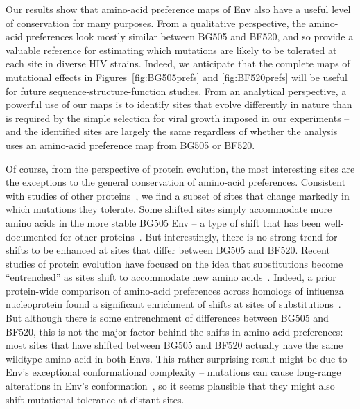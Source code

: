 \documentclass[9pt]{elife}
\begin{document}
Our results show that amino-acid preference maps of Env also have a useful level of conservation for many purposes.
From a qualitative perspective, the amino-acid preferences look mostly similar between BG505 and BF520, and so provide a valuable reference for estimating which mutations are likely to be tolerated at each site in diverse HIV strains.
Indeed, we anticipate that the complete maps of mutational effects in Figures~\ref{fig:BG505prefs} and \ref{fig:BF520prefs} will be useful for future sequence-structure-function studies.
From an analytical perspective, a powerful use of our maps is to identify sites that evolve differently in nature than is required by the simple selection for viral growth imposed in our experiments -- and the identified sites are largely the same regardless of whether the analysis uses an amino-acid preference map from BG505 or BF520.

Of course, from the perspective of protein evolution, the most interesting sites are the exceptions to the general conservation of amino-acid preferences.
Consistent with studies of other proteins~\citep{natarajan2013epistasis,harms2014historical,doud2015site,starr2017pervasive}, we find a subset of sites that change markedly in which mutations they tolerate.
Some shifted sites simply accommodate more amino acids in the more stable BG505 Env -- a type of shift that has been well-documented for other proteins~\citep{wang2002evolution,bloom2006protein,gong2013stability,kumar2017stability}.
But interestingly, there is no strong trend for shifts to be enhanced at sites that differ between BG505 and BF520.
Recent studies of protein evolution have focused on the idea that substitutions become ``entrenched'' as sites shift to accommodate new amino acids~\citep{pollock2012amino,shah2015contingency,bazykin2015changing,starr2017pervasive}.
Indeed, a prior protein-wide comparison of amino-acid preferences across homologs of influenza nucleoprotein found a significant enrichment of shifts at sites of substitutions~\citep{doud2015site}.
But although there is some entrenchment of differences between BG505 and BF520, this is not the major factor behind the shifts in amino-acid preferences: most sites that have shifted between BG505 and BF520 actually have the same wildtype amino acid in both Envs.
This rather surprising result might be due to Env's exceptional conformational complexity -- mutations can cause long-range alterations in Env's conformation~\citep{kwong2000structures,white2010molecular,almond2010structural,davenport2013isolate}, so it seems plausible that they might also shift mutational tolerance at distant sites. 
\end{document}
